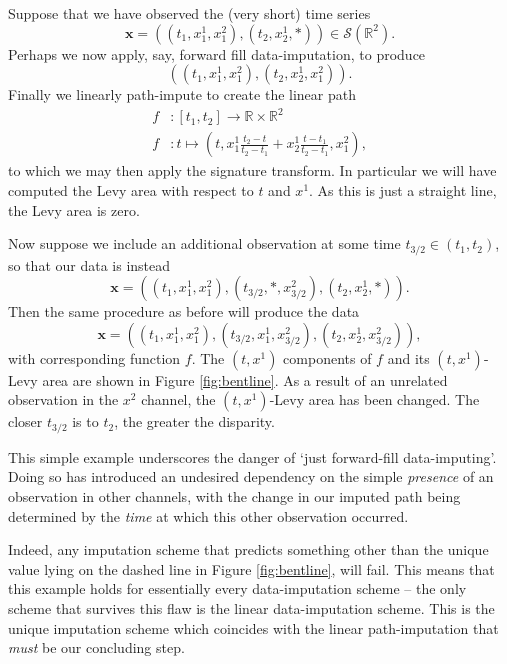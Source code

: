 \documentclass{article}
\newcommand{\reals}{\mathbb{R}}
\newcommand{\seriesspace}{\mathcal{S}}
\begin{document}
Suppose that we have observed the (very short) time series
\begin{equation}\label{eq:flaw1}
    \mathbf{x} = ((t_1, x_1^1, x_1^2), (t_2, x_2^1, *)) \in \seriesspace(\reals^2).
\end{equation}
Perhaps we now apply, say, forward fill data-imputation, to produce
\begin{equation*}
    ((t_1, x_1^1, x_1^2), (t_2, x_2^1, x_1^2)).
\end{equation*}
Finally we linearly path-impute to create the linear path
\begin{align*}
    f &\colon [t_1, t_2] \to \reals \times \reals^2\\
    f &\colon t \mapsto (t, x_1^1\frac{t_2 - t}{t_2 - t_1} + x_2^1\frac{t - t_1}{t_2 - t_1}, x_1^2),
\end{align*}
to which we may then apply the signature transform. In particular we will have computed the Levy area with respect to $t$ and $x^1$. As this is just a straight line, the Levy area is zero.

Now suppose we include an additional observation at some time $t_{3/2} \in (t_1, t_2)$, so that our data is instead
\begin{equation}\label{eq:flaw2}
    \mathbf{x} = ((t_1, x_1^1, x_1^2), (t_{3/2}, *, x_{3/2}^2), (t_2, x_2^1, *)).
\end{equation}
Then the same procedure as before will produce the data
\begin{equation*}
    \mathbf{x} = ((t_1, x_1^1, x_1^2), (t_{3/2}, x_1^1, x_{3/2}^2), (t_2, x_2^1, x_{3/2}^2)),
\end{equation*}
with corresponding function $f$. The $(t, x^1)$ components of $f$ and its $(t, x^1)$-Levy area are shown in Figure \ref{fig:bentline}. As a result of an unrelated observation in the $x^2$ channel, the $(t, x^1)$-Levy area has been changed. The closer $t_{3/2}$ is to $t_2$, the greater the disparity.

This simple example underscores the danger of `just forward-fill data-imputing'. Doing so has introduced an undesired dependency on the simple \emph{presence} of an observation in other channels, with the change in our imputed path being determined by the \emph{time} at which this other observation occurred.

Indeed, any imputation scheme that predicts something other than the unique value lying on the dashed line in Figure \ref{fig:bentline}, will fail. This means that this example holds for essentially every data-imputation scheme -- the only scheme that survives this flaw is the linear data-imputation scheme. This is the unique imputation scheme which coincides with the linear path-imputation that \emph{must} be our concluding step.
\end{document}
